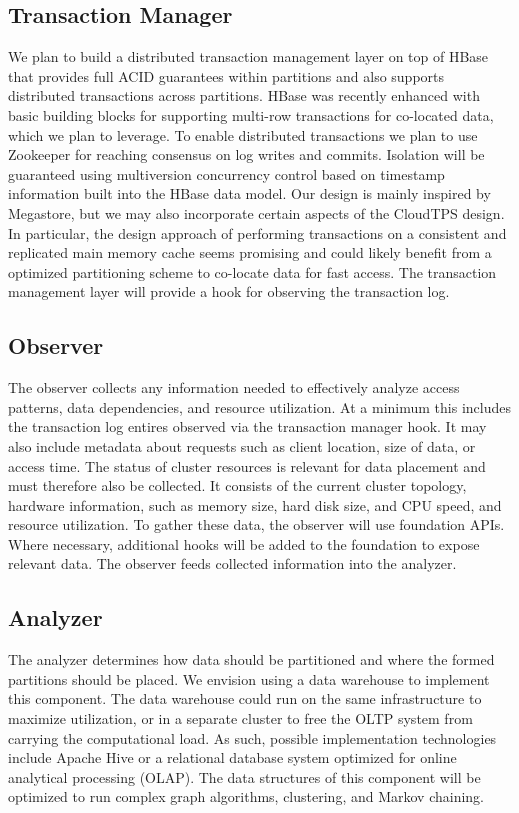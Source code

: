 \documentclass[10pt,final,journal]{IEEEtran}
\begin{document}
\subsection{Transaction Manager}
We plan to build a distributed transaction management layer on top of HBase that provides full ACID guarantees within partitions and also supports distributed transactions across partitions. HBase was recently enhanced with basic building blocks for supporting multi-row transactions for co-located data, which we plan to leverage. To enable distributed transactions we plan to use Zookeeper for reaching consensus on log writes and commits. Isolation will be guaranteed using multiversion concurrency control based on timestamp information built into the HBase data model. Our design is mainly inspired by Megastore, but we may also incorporate certain aspects of the CloudTPS design. In particular, the design approach of performing transactions on a consistent and replicated main memory cache seems promising and could likely benefit from a optimized partitioning scheme to co-locate data for fast access. The transaction management layer will provide a hook for observing the transaction log.

\subsection{Observer}
The observer collects any information needed to effectively analyze access patterns, data dependencies, and resource utilization. At a minimum this includes the transaction log entires observed via the transaction manager hook. It may also include metadata about requests such as client location, size of data, or access time. The status of cluster resources is relevant for data placement and must therefore also be collected. It consists of the current cluster topology, hardware information, such as memory size, hard disk size, and CPU speed, and resource utilization. To gather these data, the observer will use foundation APIs. Where necessary, additional hooks will be added to the foundation to expose relevant data. The observer feeds collected information into the analyzer.

\subsection{Analyzer}
The analyzer determines how data should be partitioned and where the formed partitions should be placed. We envision using a data warehouse to implement this component. The data warehouse could run on the same infrastructure to maximize utilization, or in a separate cluster to free the OLTP system from carrying the computational load. As such, possible implementation technologies include Apache Hive or a relational database system optimized for online analytical processing (OLAP). The data structures of this component will be optimized to run complex graph algorithms, clustering, and Markov chaining.
\end{document}
